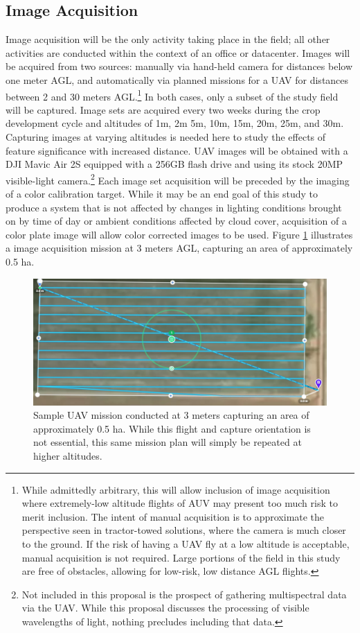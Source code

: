 \documentclass[12pt]{article}
\begin{document}
\subsection{Image Acquisition}
\label{sec:acquisition}
Image acquisition will be the only activity taking place in the field; all other activities are conducted within the context of an office or datacenter. Images will be acquired from two sources: manually via hand-held camera for distances below one meter AGL, and automatically via planned missions for a UAV for distances between 2 and 30 meters AGL.\footnote{While admittedly arbitrary, this will allow inclusion of image acquisition where extremely-low altitude flights of AUV may present too much risk to merit inclusion. The intent of manual acquisition is to approximate the perspective seen in tractor-towed solutions, where the camera is much closer to the ground. If the risk of having a UAV fly at a low altitude is acceptable, manual acquisition is not required. Large portions of the field in this study are free of obstacles, allowing for low-risk, low distance AGL flights.} In both cases, only a subset of the study field will be captured. Image sets are acquired every two weeks during the crop development cycle and altitudes of 1m, 2m 5m, 10m, 15m, 20m, 25m, and 30m. Capturing images at varying altitudes is needed here to study the effects of feature significance with increased distance.
UAV images will be obtained with a DJI Mavic Air 2S equipped with a 256GB flash drive and using its stock 20MP visible-light camera.\footnote{Not included in this proposal is the prospect of gathering multispectral data via the UAV. While this proposal discusses the processing of visible wavelengths of light, nothing precludes including that data.} Each image set acquisition will be preceded by the imaging of a color calibration target.  While it may be an end goal of this study to produce a system that is not affected by changes in lighting conditions brought on by time of day or ambient conditions affected by cloud cover, acquisition of a color plate image will allow color corrected images to be used. Figure \ref{fig:mission} illustrates a image acquisition mission at 3 meters AGL, capturing an area of approximately 0.5 ha.

\begin{figure}[h!]
	\centering
	\includegraphics[width=0.8\linewidth]{./figures/maricopa-drone-3m.jpg}
	\caption[Semple UAV mission]{Sample UAV mission conducted at 3 meters capturing an area of approximately 0.5 ha. While this flight and capture orientation is not essential, this same mission plan will simply be repeated at higher altitudes.}
	\label{fig:mission}
\end{figure}
\end{document}
